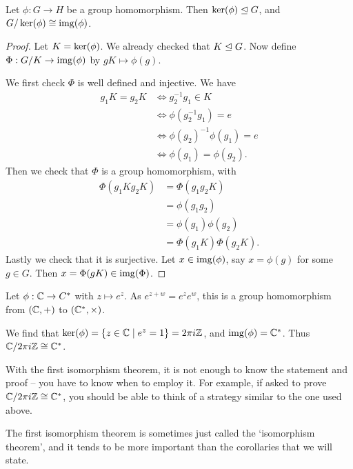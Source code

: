 \documentclass[a4paper]{scrreprt}
\begin{document}
\begin{theorem}
	Let $\phi: G \rightarrow H$ be a group homomorphism. Then $\operatorname{ker}(\phi) \trianglelefteq G$, and $G/\operatorname{ker}(\phi) \cong \operatorname{img}(\phi)$.
\end{theorem}
\begin{proof}
	Let $K = \operatorname{ker}(\phi)$. We already checked that $K \trianglelefteq G$. Now define $\Phi: G/K \rightarrow \operatorname{img}(\phi)$ by $gK \mapsto \phi(g)$.

	We first check $\Phi$ is well defined and injective. We have
	\begin{align*}
		g_1K = g_2K &\iff g_2^{-1} g_1 \in K \\
		&\iff \phi(g_2^{-1}g_1) = e \\
		&\iff \phi(g_2)^{-1} \phi(g_1) = e  \\
		&\iff \phi(g_1) = \phi(g_2).
	\end{align*}
	Then we check that $\Phi$ is a group homomorphism, with
	\begin{align*}
		\Phi(g_1 K g_2 K) &= \Phi(g_1 g_2 K) \\
			&= \phi(g_1 g_2) \\
			&= \phi(g_1) \phi(g_2) \\
			&= \Phi(g_1 K) \Phi(g_2 K).
	\end{align*}
	Lastly we check that it is surjective. Let $x \in \operatorname{img}(\phi)$, say $x = \phi(g)$ for some $g \in G$. Then $x = \Phi(gK) \in \operatorname{img}(\Phi)$.
\end{proof}

\begin{example}
	Let $\phi : \mathbb{C} \rightarrow C^{*}$ with $z \mapsto e^z$. As $e^{z + w} = e^z e^w$, this is a group homomorphism from $(\mathbb{C}, +)$ to $(\mathbb{C}^*, \times)$. 

	We find that $\operatorname{ker}(\phi) = \{ z \in \mathbb{C} \mid e^z = 1 \} = 2 \pi i \mathbb{Z}$, and $\operatorname{img}(\phi) = \mathbb{C}^*$. Thus $\mathbb{C}/2 \pi i \mathbb{Z} \cong \mathbb{C}^*$.
\end{example}

With the first isomorphism theorem, it is not enough to know the statement and proof -- you have to know when to employ it. For example, if asked to prove $\mathbb{C}/2 \pi i \mathbb{Z} \cong \mathbb{C}^*$, you should be able to think of a strategy similar to the one used above.

The first isomorphism theorem is sometimes just called the `isomorphism theorem', and it tends to be more important than the corollaries that we will state.
\end{document}
